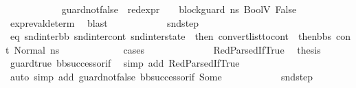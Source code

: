 \begin{isabellebody}
\ \ \ \ \ \ \ \ \ \ \isamarkupfalse%
\ guard{\isacharunderscore}{\kern0pt}not{\isacharunderscore}{\kern0pt}false{\isacharcolon}{\kern0pt}\ {\isachardoublequoteopen}{\isasymnot}\ {\isacharparenleft}{\kern0pt}red{\isacharunderscore}{\kern0pt}expr\ {\isasymLambda}\ {\isasymGamma}\ {\isasymOmega}\ block{\isacharunderscore}{\kern0pt}guard\ ns{}\ {\isacharparenleft}{\kern0pt}BoolV\ False{\isacharparenright}{\kern0pt}{\isacharparenright}{\kern0pt}{\isachardoublequoteclose}\ \isamarkupfalse%
\ expr{\isacharunderscore}{\kern0pt}eval{\isacharunderscore}{\kern0pt}determ\ \isamarkupfalse%
\ blast\isanewline
\ \ \ \ \ \ \ \ \ \ \isamarkupfalse%
\ snd{\isacharunderscore}{\kern0pt}step\ \isamarkupfalse%
\ eq{\isacharcolon}{\kern0pt}\ {\isachardoublequoteopen}{\isacharparenleft}{\kern0pt}snd{\isacharunderscore}{\kern0pt}inter{\isacharunderscore}{\kern0pt}bb{\isacharcomma}{\kern0pt}\ snd{\isacharunderscore}{\kern0pt}inter{\isacharunderscore}{\kern0pt}cont{\isacharcomma}{\kern0pt}\ snd{\isacharunderscore}{\kern0pt}inter{\isacharunderscore}{\kern0pt}state{\isacharparenright}{\kern0pt}\ {\isacharequal}{\kern0pt}\ {\isacharparenleft}{\kern0pt}then{}{\isacharcomma}{\kern0pt}\ convert{\isacharunderscore}{\kern0pt}list{\isacharunderscore}{\kern0pt}to{\isacharunderscore}{\kern0pt}cont\ {\isacharparenleft}{\kern0pt}\ then{\isacharunderscore}{\kern0pt}bbs{\isacharparenright}{\kern0pt}\ cont{}{\isacharcomma}{\kern0pt}\ Normal\ ns{}{\isacharparenright}{\kern0pt}{\isachardoublequoteclose}\ \isanewline
\ \ \ \ \ \ \ \ \ \ \isamarkupfalse%
\ cases\isanewline
\ \ \ \ \ \ \ \ \ \ \ \ \isamarkupfalse%
\ RedParsedIfTrue\ \isamarkupfalse%
\ {\isacharquery}{\kern0pt}thesis\ \isamarkupfalse%
\ guard{\isacharunderscore}{\kern0pt}true\ bb{\isacharunderscore}{\kern0pt}successor{\isacharunderscore}{\kern0pt}if\ \isamarkupfalse%
\ {\isacharparenleft}{\kern0pt}simp\ add{\isacharcolon}{\kern0pt}\ RedParsedIfTrue{\isacharparenright}{\kern0pt}\isanewline
\ \ \ \ \ \ \ \ \ \ \isamarkupfalse%
\ {\isacharparenleft}{\kern0pt}auto\ simp\ add{\isacharcolon}{\kern0pt}\ guard{\isacharunderscore}{\kern0pt}not{\isacharunderscore}{\kern0pt}false\ bb{\isacharunderscore}{\kern0pt}successor{\isacharunderscore}{\kern0pt}if\ Some{\isacharparenright}{\kern0pt}\isanewline
\isanewline
\ \ \ \ \ \ \ \ \ \ \isamarkupfalse%
\ snd{\isacharunderscore}{\kern0pt}step\ \isanewline

\end{isabellebody}
